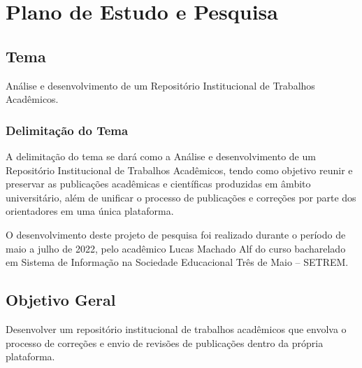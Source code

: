 \chapter{Plano de Estudo e Pesquisa} \label{chap:ResearchPlan}




\section{Tema} \label{sec::Theme}
Análise e desenvolvimento de um Repositório Institucional de Trabalhos Acadêmicos.


\subsection{Delimitação do Tema} \label{subsec::ThemeDelimitation}

A delimitação do tema se dará como a Análise e desenvolvimento de um Repositório Institucional de Trabalhos Acadêmicos, tendo como objetivo reunir e preservar as publicações acadêmicas e científicas produzidas em âmbito universitário, além de unificar o processo de publicações e correções por parte dos orientadores em uma única plataforma.

O desenvolvimento deste projeto de pesquisa foi realizado durante o período de maio a julho de 2022, pelo acadêmico Lucas Machado Alf do curso bacharelado em Sistema de Informação na Sociedade Educacional Três de Maio – SETREM.

\section{Objetivo Geral} \label{sec:objective}

Desenvolver um repositório institucional de trabalhos acadêmicos que envolva o processo de correções e envio de revisões de publicações dentro da própria plataforma.


